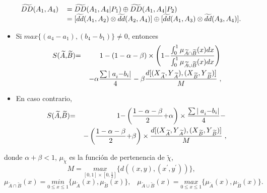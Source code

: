 \documentclass[spanish,12pt, a4paper, twoside]{paper}
\begin{document}
\begin{equation}
\begin{tabular}{ll}
$\widetilde{DD}(A_{1},A_{4})$ & $=\widetilde{DD}(A_{1},A_{4}|P_{1})\oplus 
\widetilde{DD}(A_{1},A_{4}|P_{2})$ \\ 
& $=[\widetilde{dd}(A_{1},A_{2})\otimes \widetilde{dd}(A_{2},A_{4})]\oplus \lbrack \widetilde{dd}(A_{1},A_{3})\otimes \widetilde{%
dd}(A_{3},A_{4})].$%
\end{tabular}%
\end{equation}



\begin{itemize}
\item Si$\;{max} \{(a_{4}-a_{1}),(b_{4}-b_{1})\}\neq 0$, entonces
\begin{eqnarray*}
{\small S(}\widetilde{A}{\small ,}\widetilde{B}{\small )} &{\small =}&%
\left. {\small 1-(1-\alpha -\beta })\times \left ( {\small 1-}\frac{\int_{0}^{1}%
{\small \mu }_{\widetilde{A}\cap \widetilde{B}}{\small (x)dx}}{\int_{0}^{1}%
{\small \mu }_{\widetilde{A}\cup \widetilde{B}}{\small (x)dx}}\right)
\right.  \\
&&\left. -{\small \alpha } \frac{\sum {\small \mid a}_{i}{\small -b}_{i}%
{\small \mid }}{{\small 4}}-{\small \beta }\frac{{\small d[(X}_{\widetilde{A}%
}{\small ,Y}_{\widetilde{A}}{\small ),(X}_{\widetilde{B}}{\small ,Y}_{%
\widetilde{B}}{\small )]}}{{\small M}}\right., 
\end{eqnarray*}

\item En caso contrario,%
\begin{eqnarray*}
{\small S(}\widetilde{A}{\small ,}\widetilde{B}{\small )} &{\small =}&%
\left. {\small 1-}%
\left( \frac{{\small 1-\alpha -\beta }}{{\small 2}}{\small +\alpha } \right) \times
\frac{\sum {\small \mid a}_{i}{\small -b}_{i}{\small \mid }}{{\small 4}}%
{\small -}\right.  \\
&&\left. {\small -}\left( \frac{{\small 1-\alpha -\beta }}{{\small 2}}%
{\small +\beta }\right)\times \frac{{\small d[(X}_{\widetilde{A}}{\small ,Y}_{%
\widetilde{A}}{\small ),(X}_{\widetilde{B}}{\small ,Y}_{\widetilde{B}}%
{\small )]}}{{\small M}}\right., 
\end{eqnarray*}
\end{itemize}
donde $\alpha +\beta <1$, $\mu _{\widetilde{\chi }}$ es la función de pertenencia de $\widetilde{\chi}$, 
\begin{equation}
M=\underset{[0,1]\times[0,\frac{1}{2}]}{max}\{d((x,y),(x^{\prime },y^{\prime }))\}\text{,} 
\end{equation}%
\begin{equation*}
\mu _{\widetilde{A}\cap \widetilde{B}}(x)=\underset{0\leq x\leq 1}{min}%
\{\mu _{\widetilde{A}}(x),\mu _{\widetilde{B}}(x)\} ,
\;\;\; \mu _{\widetilde{A}\cup \widetilde{B}}(x)=\underset{0\leq x\leq 1}{max}%
\{\mu _{\widetilde{A}}(x),\mu _{\widetilde{B}}(x)\}.
\end{equation*}%
\end{document}
